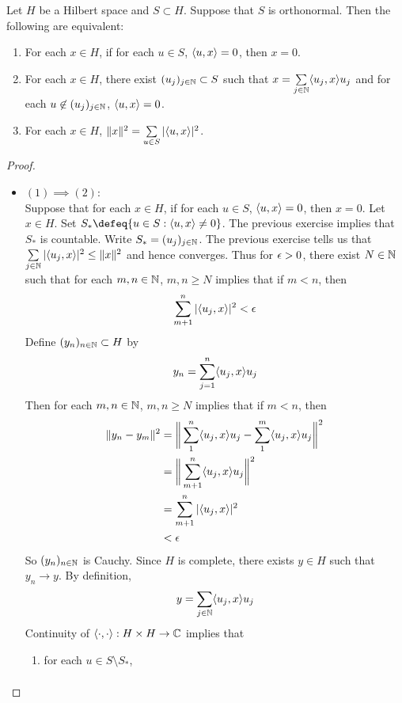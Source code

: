 \documentclass{book}
\begin{document}
\begin{ex} \lex{}
Let $H$ be a Hilbert space and $S \subset H$. Suppose that  $S$ is orthonormal. Then the following are equivalent: 
\begin{enumerate}
\item For each $x \in H$, if for each $u \in S$, $\langle u, x \rangle = 0$, then $x =0$.
\item For each $x \in H$, there exist $(u_j)_{j\in \mathbb{N}} \subset S$ such that $x = \sum\limits_{j \in \mathbb{N}} \langle u_j, x\rangle u_j$ and for each $u \not \in (u_j)_{j\in \mathbb{N}}$, $\langle u, x\rangle =0$.
\item For each $x \in H$, $\|x\|^2 = \sum\limits_{u \in S} | \langle u, x \rangle |^2$.
\end{enumerate}
\end{ex}

\begin{proof}\
\begin{itemize}
		\item $(1) \implies (2)$:\\
		Suppose that for each $x \in H$, if for each $u \in S$, $\langle u, x \rangle = 0$, then $x =0$. Let $x \in H$. Set $S_{*} \defeq \{u \in S: \l u, x \r \neq 0 \}$. The previous exercise implies that $S_{*}$ is countable. Write $S_* = (u_j)_{j \in \mathbb{N}}$. The previous exercise tells us that $\sum\limits_{j \in \mathbb{N}} |\langle u_j, x \rangle|^2 \leq \|x\|^2$ and hence converges. Thus for $\epsilon >0$, there exist $N \in \mathbb{N}$ such that for each  $m,n \in \mathbb{N}$, $m, n \geq N$ implies that if $m < n$, then $$\sum_{m+1}^{n} |\langle u_j, x \rangle |^2 < \epsilon$$
		Define $(y_n)_{n \in \mathbb{N}} \subset H$ by $$y_n = \sum_{j=1}^{n} \langle u_j, x \rangle u_j$$ 
		Then for each $m,n \in \mathbb{N}$, $m, n \geq N$ implies that if $m < n$, then 
		\begin{align*}
		\|y_n - y_m\|^2 
		& = \bigg \|\sum_{1}^{n} \langle u_j, x \rangle u_j  - \sum_{1}^{m} \langle u_j, x \rangle u_j  \bigg \|^2 \\
		&= \bigg \|\sum_{m+1}^{n} \langle u_j, x \rangle u_j \bigg \|^2 \\
		&= \sum_{m+1}^{n} |\langle u_j, x \rangle |^2 \\
		& < \epsilon
		\end{align*}
		So $(y_n)_{n \in \mathbb{N}}$ is Cauchy. Since $H$ is complete, there exists $y \in H$ such that $y_n \rightarrow y$. By definition, $$y = \sum\limits_{j \in \mathbb{N}}\langle u_j, x \rangle u_j $$
		Continuity of $\langle \cdot, \cdot\rangle: H \times H \rightarrow \mathbb{C}$ implies that 
		\begin{enumerate}
		\item for each $u \in S \setminus  S_*$, 
		\begin{align*}

\end{align*}
\end{enumerate}
\end{itemize}
\end{proof}
\end{document}
